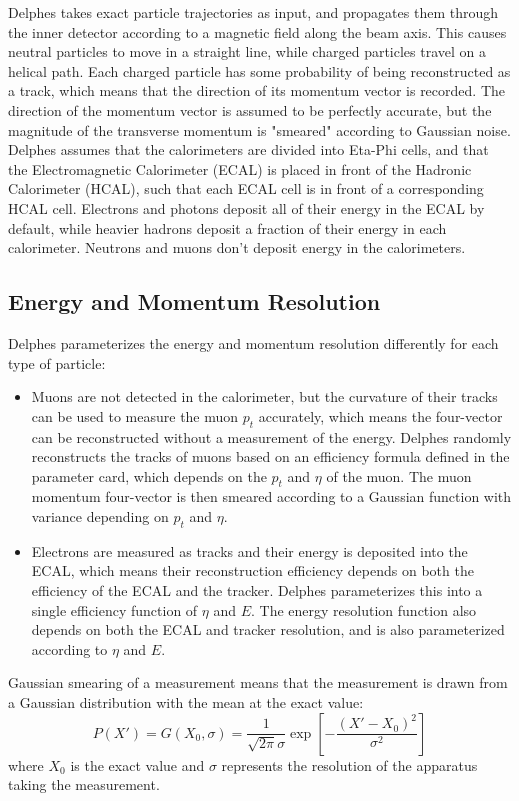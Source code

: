 \documentclass[10pt]{ucscthesisbs}
\begin{document}
Delphes takes exact particle trajectories as input, and propagates them through the inner detector according to a magnetic field along the beam axis. \cite{delphes} This causes neutral particles to move in a straight line, while charged particles travel on a helical path. Each charged particle has some probability of being reconstructed as a track, which means that the direction of its momentum vector is recorded. The direction of the momentum vector is assumed to be perfectly accurate, but the magnitude of the transverse momentum is "smeared" according to Gaussian noise. Delphes assumes that the calorimeters are divided into Eta-Phi cells, and that the Electromagnetic Calorimeter (ECAL) is placed in front of the Hadronic Calorimeter (HCAL), such that each ECAL cell is in front of a corresponding HCAL cell. Electrons and photons deposit all of their energy in the ECAL by default, while heavier hadrons deposit a fraction of their energy in each calorimeter. Neutrons and muons don't deposit energy in the calorimeters. 
\subsection{Energy and Momentum Resolution}
Delphes parameterizes the energy and momentum resolution differently for each type of particle:
\begin{itemize}
\item Muons are not detected in the calorimeter, but the curvature of their tracks can be used to measure the muon $p_t$ accurately, which means the four-vector can be reconstructed without a measurement of the energy. Delphes randomly reconstructs the tracks of muons based on an efficiency formula defined in the parameter card, which depends on the $p_t$ and $\eta$ of the muon. The muon momentum four-vector is then smeared according to a Gaussian function with variance depending on $p_t$ and $\eta$.
\item Electrons are measured as tracks and their energy is deposited into the ECAL, which means their reconstruction efficiency depends on both the efficiency of the ECAL and the tracker. Delphes parameterizes this into a single efficiency function of $\eta$ and $E$. The energy resolution function also depends on both the ECAL and tracker resolution, and is also parameterized according to $\eta$ and $E$. 
\end{itemize}
Gaussian smearing of a measurement means that the measurement is drawn from a Gaussian distribution with the mean at the exact value:
\begin{equation} \label{eq:gausssmear}
P(X') = G(X_0, \sigma) = \frac{1}{\sqrt{2\pi}\sigma}\exp{[-\frac{(X' - X_0)^2}{\sigma^2}]}
\end{equation}
where $X_0$ is the exact value and $\sigma$ represents the resolution of the apparatus taking the measurement.
\end{document}
